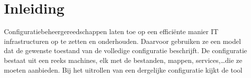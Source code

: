 \chapter{Inleiding}
\label{inleiding}
Configuratiebeheergereedschappen laten toe op een effici\"ente manier IT infrastructuren op te zetten en onderhouden.
Daarvoor gebruiken ze een model dat de gewenste toestand van de volledige configuratie beschrijft.
De configuratie bestaat uit een reeks machines, elk met de bestanden, mappen, services,\ldots die ze moeten aanbieden.
Bij het uitrollen van een dergelijke configuratie kijkt de tool 



